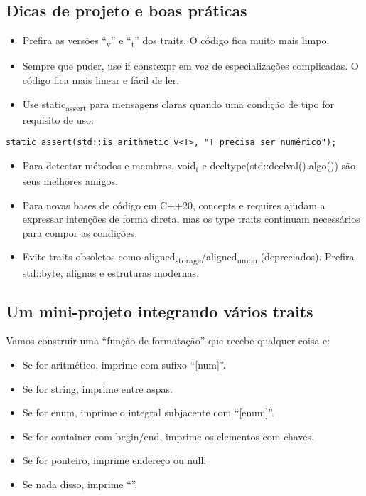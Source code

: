 \documentclass[11pt]{article}
\begin{document}
\subsection{Dicas de projeto e boas práticas}
\label{sec:org0237504}

\begin{itemize}
\item Prefira as versões “\textsubscript{v}” e “\textsubscript{t}” dos traits. O código fica muito mais limpo.
\item Sempre que puder, use if constexpr em vez de especializações complicadas. O código fica mais linear e fácil de ler.
\item Use static\textsubscript{assert} para mensagens claras quando uma condição de tipo for requisito de uso:
\end{itemize}
\begin{verbatim}
static_assert(std::is_arithmetic_v<T>, "T precisa ser numérico");
\end{verbatim}
\begin{itemize}
\item Para detectar métodos e membros, void\textsubscript{t} e decltype(std::declval().algo()) são seus melhores amigos.
\item Para novas bases de código em C++20, concepts e requires ajudam a expressar intenções de forma direta, mas os type traits continuam necessários para compor as condições.
\item Evite traits obsoletos como aligned\textsubscript{storage}/aligned\textsubscript{union} (depreciados). Prefira std::byte, alignas e estruturas modernas.
\end{itemize}
\subsection{Um mini-projeto integrando vários traits}
\label{sec:orgd574631}

Vamos construir uma “função de formatação” que recebe qualquer coisa e:
\begin{itemize}
\item Se for aritmético, imprime com sufixo “[num]”.
\item Se for string, imprime entre aspas.
\item Se for enum, imprime o integral subjacente com “[enum]”.
\item Se for container com begin/end, imprime os elementos com chaves.
\item Se for ponteiro, imprime endereço ou null.
\item Se nada disso, imprime “”.
\end{itemize}
\end{document}
